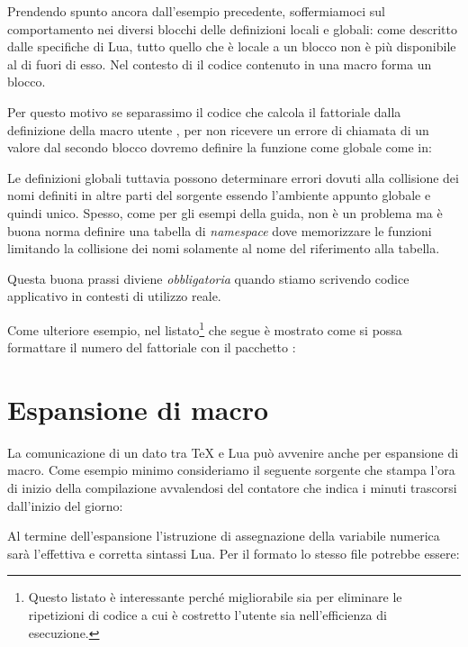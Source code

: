 Prendendo spunto ancora dall'esempio precedente, soffermiamoci sul comportamento
nei diversi blocchi  delle definizioni locali e globali: come
descritto dalle specifiche di Lua, tutto quello che è locale a un blocco non è
più disponibile al di fuori di esso. Nel contesto di \LuaTeX{} il codice
contenuto in una macro  forma un blocco.

Per questo motivo se separassimo il codice che calcola il fattoriale dalla
definizione della macro utente , per non ricevere un errore di
chiamata di un valore  dal secondo blocco dovremo definire la funzione
come globale come in:

Le definizioni globali tuttavia possono determinare errori dovuti alla
collisione dei nomi definiti in altre parti del sorgente essendo l'ambiente
appunto globale e quindi unico. Spesso, come per gli esempi della guida, non è
un problema ma è buona norma definire una tabella di \emph{namespace} dove
memorizzare le funzioni limitando la collisione dei nomi solamente al nome del
riferimento alla tabella.

Questa buona prassi diviene \emph{obbligatoria} quando stiamo scrivendo codice
applicativo in contesti di utilizzo reale.

Come ulteriore esempio, nel listato\footnote{Questo listato è interessante
perché migliorabile sia per eliminare le ripetizioni di codice a cui è costretto
l'utente sia nell'efficienza di esecuzione.} che segue è mostrato come si possa
formattare il numero del fattoriale con il pacchetto :


\section{Espansione di macro}

La comunicazione di un dato tra \TeX{} e Lua può avvenire anche per espansione
di macro. Come esempio minimo consideriamo il seguente sorgente \LuaTeX{} che
stampa l'ora di inizio della compilazione avvalendosi del contatore 
che indica i minuti trascorsi dall'inizio del giorno:

Al termine dell'espansione l'istruzione di assegnazione della variabile numerica
 sarà l'effettiva e corretta sintassi Lua. Per il formato \LuaLaTeX{}
lo stesso file potrebbe essere:

